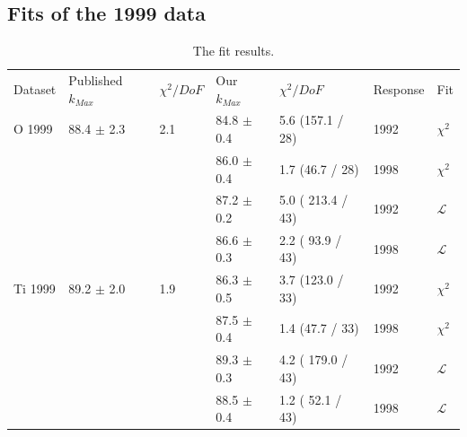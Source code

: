 \subsection { Fits of the 1999 data }

\begin{table}[h]
  \begin{center}
    \begin{tabular}{|l||l|l|l|l|l|l|}
      \hline
      Dataset & Published $k_{Max}$ & $\chi^2 / DoF$ & Our $k_{Max}$ & $\chi^2 / DoF$  & Response & Fit \\
      \hhline{|=||=|=|=|=|=|=|}
       O 1999    & 88.4 $\pm$ 2.3 & 2.1 & 84.8 $\pm$ 0.4 &  5.6 (157.1 / 28)& 1992 & $\chi^2$ \\  
                 &                &     & 86.0 $\pm$ 0.4 &  1.7 (46.7 / 28) & 1998 & $\chi^2$ \\  
                                                                             
                 &                &     & 87.2 $\pm$ 0.2 & 5.0 ( 213.4 / 43)& 1992 & $\mathcal{L}$\\
                 &                &     & 86.6 $\pm$ 0.3 & 2.2 ( 93.9 / 43) & 1998 & $\mathcal{L}$\\
      \hline                                                                 
       Ti 1999   & 89.2 $\pm$ 2.0 & 1.9 & 86.3 $\pm$ 0.5 &  3.7 (123.0 / 33)& 1992 & $\chi^2$ \\  
                 &                &     & 87.5 $\pm$ 0.4 &  1.4 (47.7 / 33) & 1998 & $\chi^2$ \\  
                                                                             
                 &                &     & 89.3 $\pm$ 0.3 & 4.2 ( 179.0 / 43) & 1992 & $\mathcal{L}$ \\
                 &                &     & 88.5 $\pm$ 0.4 & 1.2 ( 52.1 / 43) & 1998 & $\mathcal{L}$ \\
      \hline                           
    \end{tabular}
  \end{center}
  \caption{The fit results.}
  \label{table:fits1999}
\end{table}



